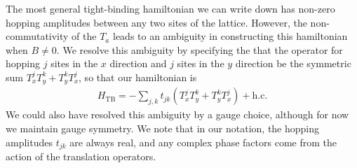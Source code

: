 \documentclass[aps,prb,twocolumn,letterpaper,twoside,nobalancelastpage,groupedaddress,amsmath,amssymb,floatfix,citeautoscript]{revtex4-1}
\begin{document}
The most general tight-binding hamiltonian we can write down has non-zero hopping amplitudes between any two sites of the lattice. However, the non-commutativity of the $T_a$ leads to an ambiguity in constructing this hamiltonian when $B\neq0$. We resolve this ambiguity by specifying the that the operator for hopping $j$ sites in the $x$ direction and $j$ sites in the $y$ direction be the symmetric sum $T_x^j T_y^k + T_y^kT_x^j$, so that our hamiltonian is
\begin{align*}
H_{\text{TB}} = -\sum_{j,k} t_{jk}\left(T_x^j T_y^k + T_y^kT_x^j\right) + \text{h.c.}
\end{align*}
We could also have resolved this ambiguity by a gauge choice, although for now we maintain gauge symmetry. We note that in our notation, the hopping amplitudes $t_{jk}$ are always real, and any complex phase factors come from the action of the translation operators.
\end{document}
